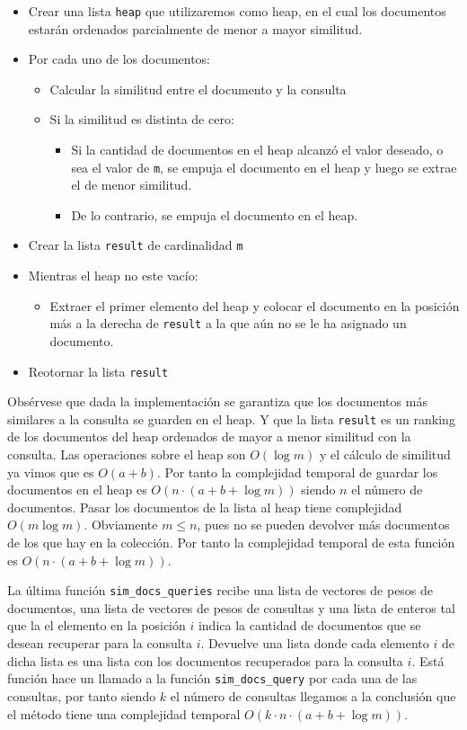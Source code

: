 \documentclass[runningheads]{llncs}
\begin{document}
	\begin{itemize}
		\item Crear una lista \verb|heap| que utilizaremos como heap, en el cual los documentos estar\'an ordenados parcialmente de menor a mayor similitud.
		\item Por cada uno de los documentos:
		\begin{itemize}
			\item Calcular la similitud entre el documento y la consulta
			\item Si la similitud es distinta de cero:
			\begin{itemize}
				\item Si la cantidad de documentos en el heap alcanz\'o el valor deseado, o sea el valor de \verb|m|, se empuja el documento en el heap y luego se extrae el de menor similitud.
				\item De lo contrario, se empuja el documento en el heap.
			\end{itemize}
		\end{itemize}
		\item Crear la lista \verb|result| de cardinalidad \verb|m|
		\item Mientras el heap no este vac\'io:
		\begin{itemize}
			\item Extraer el primer elemento del heap y colocar el documento en la posici\'on m\'as a la derecha de \verb|result| a la que a\'un no se le ha asignado un documento.
		\end{itemize}
		\item Reotornar la lista \verb|result|
	\end{itemize}
	
	Obs\'ervese que dada la implementaci\'on se garantiza que los documentos m\'as similares a la consulta se guarden en el heap. Y que la lista \verb|result| es un ranking de los documentos del heap ordenados de mayor a menor similitud con la consulta. Las operaciones sobre el heap son $O(\log m)$ y el c\'alculo de similitud ya vimos que es $O(a + b)$. Por tanto la complejidad temporal de guardar los documentos en el heap es $O(n\cdot(a+b+\log m))$
	siendo $n$ el n\'umero de documentos. Pasar los documentos de la lista al heap tiene complejidad $O(m\log m)$. Obviamente $m\leq n$, pues no se pueden devolver m\'as documentos de los que hay en la colecci\'on. Por tanto la complejidad temporal de esta funci\'on es $O(n\cdot(a+b+\log m))$.
	
	La \'ultima funci\'on \verb|sim_docs_queries| recibe una lista de vectores de pesos de documentos, una lista de vectores de pesos de consultas y una lista de enteros tal que la el elemento en la posici\'on $i$ indica la cantidad de documentos que se desean recuperar para la consulta $i$. Devuelve una lista donde cada elemento $i$ de dicha lista es una lista con los documentos recuperados para la consulta $i$. Est\'a funci\'on hace un llamado a la funci\'on \verb|sim_docs_query| por cada una de las consultas, por tanto siendo $k$ el n\'umero de consultas llegamos a la conclusi\'on que el m\'etodo tiene una complejidad temporal $O(k\cdot n\cdot(a+b+\log m))$.
	
\end{document}
